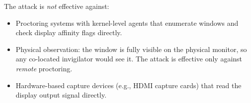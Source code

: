 \documentclass[conference]{IEEEtran}
\begin{document}
The attack is \textit{not} effective against:
\begin{itemize}
\item Proctoring systems with kernel-level agents that enumerate windows and check display affinity flags directly.
\item Physical observation: the window is fully visible on the physical monitor, so any co-located invigilator would see it. The attack is effective only against \textit{remote} proctoring.
\item Hardware-based capture devices (e.g., HDMI capture cards) that read the display output signal directly.
\end{itemize}

\end{document}

